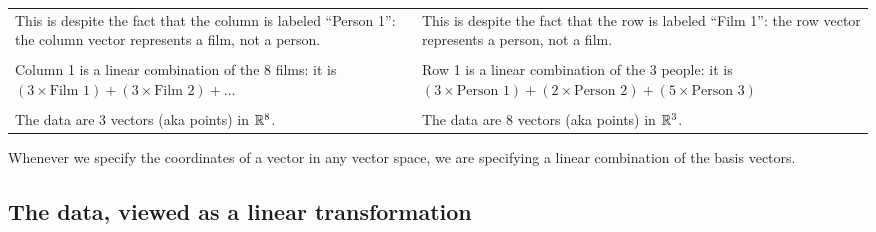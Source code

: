\begin{tabular}{|p{8cm}|p{8 cm}|}
  This is despite the fact that the column is labeled ``Person 1'': the column vector represents a film, not a person.
  &This is despite the fact that the row is labeled ``Film 1'': the row vector represents a person, not a film.\\
  &\\

  Column 1 is a linear combination of the 8 films: it is
  $(3 \times \text{Film 1}) + (3 \times \text{Film 2}) + \ldots$
  &Row 1 is a linear combination of the 3 people: it is
    $(3 \times \text{Person 1}) + (2 \times \text{Person 2}) + (5 \times \text{Person 3})$\\
  &\\

  The data are 3 vectors (aka points) in $\mathbb{R}^8$.
  &The data are 8 vectors (aka points) in $\mathbb{R}^3$.
\end{tabular}

Whenever we specify the coordinates of a vector in any vector space, we are specifying a linear
combination of the basis vectors.

\newpage
\subsection*{The data, viewed as a linear transformation}

